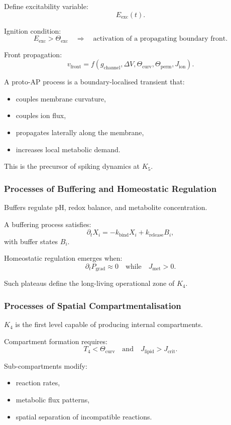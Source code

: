 Define excitability variable:
\[
E_{\text{exc}}(t).
\]

Ignition condition:
\[
E_{\text{exc}} > \Theta_{\text{exc}}
\quad\Rightarrow\quad
\text{activation of a propagating boundary front}.
\]

Front propagation:
\[
v_{\text{front}} = f(g_{\text{channel}}, \Delta V, \Theta_{\text{curv}},
\Theta_{\text{perm}}, J_{\text{ion}}).
\]

A proto-AP process is a boundary-localised transient that:
\begin{itemize}
    \item couples membrane curvature,
    \item couples ion flux,
    \item propagates laterally along the membrane,
    \item increases local metabolic demand.
\end{itemize}

This is the precursor of spiking dynamics at $K_5$.

\subsubsection{Processes of Buffering and Homeostatic Regulation}

Buffers regulate pH, redox balance, and metabolite concentration.

A buffering process satisfies:
\[
\partial_t X_i = -k_{\text{bind}} X_i + k_{\text{release}} B_i,
\]
with buffer states $B_i$.

Homeostatic regulation emerges when:
\[
\partial_t P_\text{grad} \approx 0
\quad\text{while}\quad 
J_{\text{met}} > 0.
\]

Such plateaus define the long-living operational zone of $K_4$.

\subsubsection{Processes of Spatial Compartmentalisation}

$K_4$ is the first level capable of producing internal compartments.

Compartment formation requires:
\[
T_4 < \Theta_{\text{curv}} \quad\text{and}\quad
J_{\text{lipid}} > J_{\text{crit}}.
\]

Sub-compartments modify:
\begin{itemize}
    \item reaction rates,
    \item metabolic flux patterns,
    \item spatial separation of incompatible reactions.
\end{itemize}

